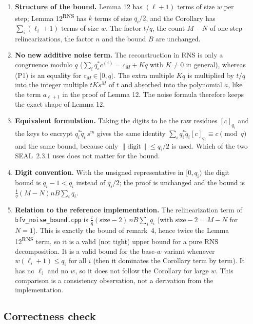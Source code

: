 \documentclass[11pt]{article}
\newcommand{\norm}[1]{\left\lVert #1\right\rVert}
\newcommand{\qstar}[1]{q^{*}_{#1}}
\newcommand{\qtilde}[1]{\tilde{q}_{#1}}
\theoremstyle{plain}
\theoremstyle{definition}
\theoremstyle{remark}
\begin{document}
\begin{enumerate}[leftmargin=2em]
\item \textbf{Structure of the bound.} Lemma 12 has $(\ell+1)$ terms of size $w$ per step;
      Lemma 12\textsuperscript{RNS} has $k$ terms of size $q_i/2$, and the Corollary has
      $\sum_i(\ell_i+1)$ terms of size $w$. The factor $t/q$, the count $M-N$ of one-step
      relinearizations, the factor $n$ and the bound $B$ are unchanged.
\item \textbf{No new additive noise term.} The reconstruction in RNS is only a congruence modulo $q$
      ($\sum_i\qstar{i}c^{(i)}=c_M+Kq$ with $K\neq0$ in general), whereas (P1) is an equality for
      $c_M\in[0,q)$. The extra multiple $Kq$ is multiplied by $t/q$ into the integer multiple $tKs^M$
      of $t$ and absorbed into the polynomial $a$, like the term $a_{\ell+1}$ in the proof of Lemma 12.
      The noise formula therefore keeps the exact shape of Lemma 12.
\item \textbf{Equivalent formulation.} Taking the digits to be the raw residues $[c]_{q_i}$ and the
      keys to encrypt $\qstar{i}\qtilde{i}\,s^m$ gives the same identity $\sum_i\qstar{i}\qtilde{i}[c]_{q_i}\equiv c\pmod q$
      and the same bound, because only $\norm{\text{digit}}\leq q_i/2$ is used. Which of the two SEAL~2.3.1
      uses does not matter for the bound.
\item \textbf{Digit convention.} With the unsigned representative in $[0,q_i)$ the digit bound is
      $q_i-1<q_i$ instead of $q_i/2$; the proof is unchanged and the bound is $\frac tq(M-N)nB\sum_iq_i$.
\item \textbf{Relation to the reference implementation.} The relinearization term of
      \texttt{bfv\_noise\_bound.cpp} is $\frac tq(\text{size}-2)\,nB\sum_iq_i$ (with $\text{size}-2=M-N$ for $N=1$).
      This is exactly the bound of remark~4, hence twice the Lemma 12\textsuperscript{RNS} term, so it is a valid
      (not tight) upper bound for a pure RNS decomposition. It is a valid bound for the base-$w$ variant
      whenever $w(\ell_i+1)\leq q_i$ for all $i$ (then it dominates the Corollary term by term). It has no
      $\ell_i$ and no $w$, so it does not follow the Corollary for large $w$. This comparison is a consistency
      observation, not a derivation from the implementation.
\end{enumerate}

\subsection{Correctness check}
\end{document}
